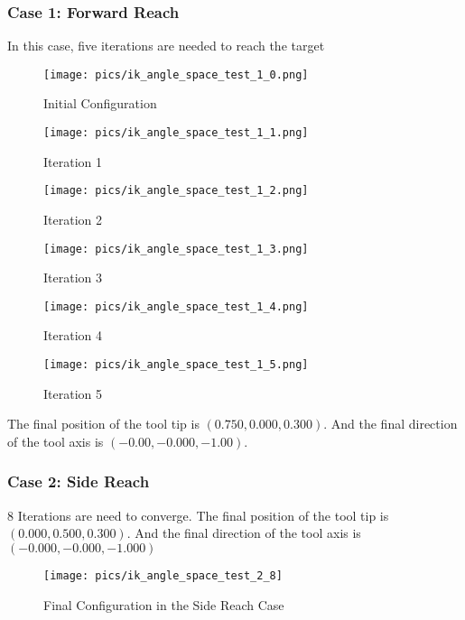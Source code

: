 \documentclass[english,10pt,a4paper]{book}
\begin{document}
		\subsubsection{Case 1: Forward Reach}
		In this case, five iterations are needed to reach the target
		\begin{figure}[H]
			\begin{minipage}{0.33\textwidth}
				\centering
				\texttt{[image: pics/ik\_angle\_space\_test\_1\_0.png]}
				\caption{Initial Configuration}
			\end{minipage}
			\begin{minipage}{0.33\textwidth}
				\centering
				\texttt{[image: pics/ik\_angle\_space\_test\_1\_1.png]}
				\caption{Iteration 1}
			\end{minipage}
			\begin{minipage}{0.33\textwidth}
				\centering
				\texttt{[image: pics/ik\_angle\_space\_test\_1\_2.png]}
				\caption{Iteration 2}
			\end{minipage}
		\end{figure}
		\begin{figure}[H]
			\begin{minipage}{0.33\textwidth}
				\centering
				\texttt{[image: pics/ik\_angle\_space\_test\_1\_3.png]}
				\caption{Iteration 3}
			\end{minipage}
			\begin{minipage}{0.33\textwidth}
				\centering
				\texttt{[image: pics/ik\_angle\_space\_test\_1\_4.png]}
				\caption{Iteration 4}
			\end{minipage}
			\begin{minipage}{0.33\textwidth}
				\centering
				\texttt{[image: pics/ik\_angle\_space\_test\_1\_5.png]}
				\caption{Iteration 5}
			\end{minipage}
		\end{figure}
		The final position of the tool tip is \((0.750, 0.000, 0.300)\). And the final direction of the tool axis is \((-0.00, -0.000, -1.00)\).
		\subsubsection{Case 2: Side Reach}
		8 Iterations are need to converge. The final position of the tool tip is \((0.000, 0.500, 0.300)\). And the final direction of the tool axis is \((-0.000, -0.000, -1.000)\)
		\begin{figure}[H]
			\centering
			\texttt{[image: pics/ik\_angle\_space\_test\_2\_8]}
			\caption{Final Configuration in the Side Reach Case}
		\end{figure}
\end{document}
